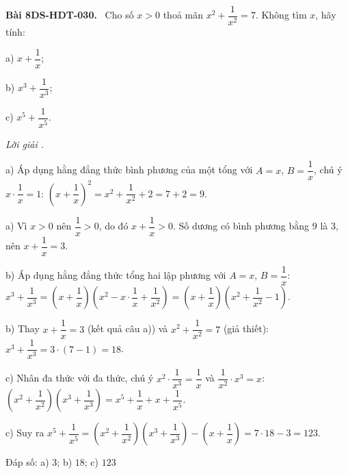 \documentclass[12pt,a4paper]{article}
\newenvironment{problem}[1][]{\par\medskip\noindent\textbf{Bài #1.}\ }{\par}
\newenvironment{solution}[1][]{\par\noindent\textit{Lời giải #1.}\par}{\par}
\begin{document}
\begin{problem}[8DS-HDT-030]
Cho số $x > 0$ thoả mãn $x^2 + \dfrac{1}{x^2} = 7$. Không tìm $x$, hãy tính:

a) $x + \dfrac{1}{x}$;

b) $x^3 + \dfrac{1}{x^3}$;

c) $x^5 + \dfrac{1}{x^5}$.

\begin{solution}
a) Áp dụng hằng đẳng thức bình phương của một tổng với $A = x$, $B = \dfrac{1}{x}$, chú ý $x \cdot \dfrac{1}{x} = 1$: $\left(x + \dfrac{1}{x}\right)^2 = x^2 + \dfrac{1}{x^2} + 2 = 7 + 2 = 9$.

a) Vì $x > 0$ nên $\dfrac{1}{x} > 0$, do đó $x + \dfrac{1}{x} > 0$. Số dương có bình phương bằng $9$ là $3$, nên $x + \dfrac{1}{x} = 3$.

b) Áp dụng hằng đẳng thức tổng hai lập phương với $A = x$, $B = \dfrac{1}{x}$: $x^3 + \dfrac{1}{x^3} = \left(x + \dfrac{1}{x}\right)\left(x^2 - x \cdot \dfrac{1}{x} + \dfrac{1}{x^2}\right) = \left(x + \dfrac{1}{x}\right)\left(x^2 + \dfrac{1}{x^2} - 1\right)$.

b) Thay $x + \dfrac{1}{x} = 3$ (kết quả câu a)) và $x^2 + \dfrac{1}{x^2} = 7$ (giả thiết): $x^3 + \dfrac{1}{x^3} = 3 \cdot (7 - 1) = 18$.

c) Nhân đa thức với đa thức, chú ý $x^2 \cdot \dfrac{1}{x^3} = \dfrac{1}{x}$ và $\dfrac{1}{x^2} \cdot x^3 = x$: $\left(x^2 + \dfrac{1}{x^2}\right)\left(x^3 + \dfrac{1}{x^3}\right) = x^5 + \dfrac{1}{x} + x + \dfrac{1}{x^5}$.

c) Suy ra $x^5 + \dfrac{1}{x^5} = \left(x^2 + \dfrac{1}{x^2}\right)\left(x^3 + \dfrac{1}{x^3}\right) - \left(x + \dfrac{1}{x}\right) = 7 \cdot 18 - 3 = 123$.

Đáp số: a) $\boxed{3}$; b) $\boxed{18}$; c) $\boxed{123}$
\end{solution}
\end{problem}
\end{document}
